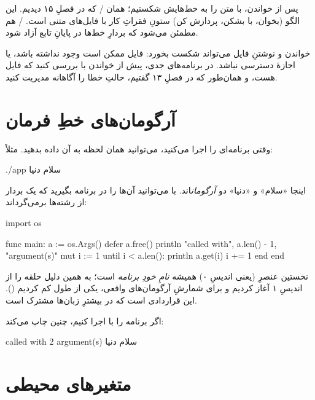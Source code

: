 پس از خواندن، با  متن را به
خط‌هایش شکستیم؛ همان / که در فصلِ ۱۵ دیدیم. این الگو
(بخوان، با  بشکن، پردازش کن) ستونِ فقراتِ کار با فایل‌های
متنی است. / هم مطمئن می‌شود که بردارِ خط‌ها در پایانِ
تابع آزاد شود.

\begin{warn}
خواندن و نوشتنِ فایل می‌تواند شکست بخورد: فایل ممکن است وجود نداشته باشد، یا
اجازهٔ دسترسی نباشد. در برنامه‌های جدی، پیش از خواندن با 
بررسی کنید که فایل هست، و همان‌طور که در فصلِ ۱۳ گفتیم، حالتِ خطا را آگاهانه
مدیریت کنید.
\end{warn}

\section{آرگومان‌های خطِ فرمان}

وقتی برنامه‌ای را اجرا می‌کنید، می‌توانید همان لحظه به آن داده بدهید. مثلاً:

\begin{salamen}[language={}]
./app سلام دنیا
\end{salamen}

اینجا «سلام» و «دنیا» دو \emph{آرگومان}اند. با  می‌توانید
آن‌ها را در برنامه بگیرید که یک بردار از رشته‌ها برمی‌گرداند:

\begin{salamen}
import os

func main:
    a := os.Args()
    defer a.free()
    println "called with", a.len() - 1, "argument(s)"
    mut i := 1
    until i < a.len():
        println a.get(i)
        i += 1
    end
end
\end{salamen}

\begin{note}
نخستین عنصرِ  (یعنی اندیسِ ۰) همیشه \emph{نامِ خودِ برنامه}
است؛ به همین دلیل حلقه را از اندیسِ ۱ آغاز کردیم و برای شمارشِ آرگومان‌های
واقعی، یکی از طول کم کردیم (). این قراردادی است که در بیشترِ
زبان‌ها مشترک است.
\end{note}

اگر برنامه را با  اجرا کنیم، چنین چاپ می‌کند:

\begin{progout}
called with 2 argument(s)
سلام
دنیا
\end{progout}

\section{متغیرهای محیطی}


